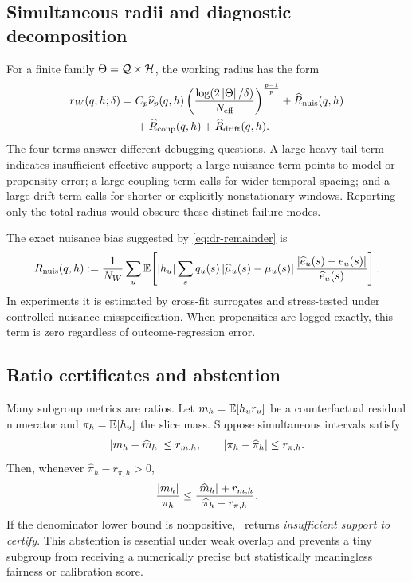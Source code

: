 \subsection{Simultaneous radii and diagnostic decomposition}
For a finite family $\Theta=\mathcal{Q}\times\mathcal{H}$, the working radius has the form
\begin{equation}
\begin{split}
 r_W(q,h;\delta)
 ={}& C_p\widehat\nu_p(q,h)
 \left(\frac{\log(2\left|\Theta\right|/\delta)}{N_{\mathrm{eff}}}\right)^{\frac{p-1}{p}}
 +\widehat R_{\mathrm{nuis}}(q,h)\\
 &+\widehat R_{\mathrm{coup}}(q,h)
 +\widehat R_{\mathrm{drift}}(q,h).
\end{split}
\label{eq:radius}
\end{equation}
The four terms answer different debugging questions. A large heavy-tail term indicates insufficient effective support; a large nuisance term points to model or propensity error; a large coupling term calls for wider temporal spacing; and a large drift term calls for shorter or explicitly nonstationary windows. Reporting only the total radius would obscure these distinct failure modes.

The exact nuisance bias suggested by \cref{eq:dr-remainder} is
\begin{equation}
R_{\mathrm{nuis}}(q,h)
:=\frac{1}{N_W}\sum_u
\mathbb{E}\!\left[
\left|h_u\right|\sum_s q_u(s)
\left|\widehat\mu_u(s)-\mu_u(s)\right|
\frac{\left|\widehat e_u(s)-e_u(s)\right|}{\widehat e_u(s)}
\right].
\label{eq:nuisance-rem}
\end{equation}
In experiments it is estimated by cross-fit surrogates and stress-tested under controlled nuisance misspecification. When propensities are logged exactly, this term is zero regardless of outcome-regression error.

\subsection{Ratio certificates and abstention}
Many subgroup metrics are ratios. Let $m_h=\mathbb{E}[h_u r_u]$ be a counterfactual residual numerator and $\pi_h=\mathbb{E}[h_u]$ the slice mass. Suppose simultaneous intervals satisfy
\begin{equation}
    \left|m_h-\widehat m_h\right|\le r_{m,h},
    \qquad
    \left|\pi_h-\widehat\pi_h\right|\le r_{\pi,h}.
\end{equation}
Then, whenever $\widehat\pi_h-r_{\pi,h}>0$,
\begin{equation}
    \frac{\left|m_h\right|}{\pi_h}
    \le
    \frac{\left|\widehat m_h\right|+r_{m,h}}
         {\widehat\pi_h-r_{\pi,h}}.
    \label{eq:ratio-cert}
\end{equation}
If the denominator lower bound is nonpositive, \COMET\ returns \emph{insufficient support to certify}. This abstention is essential under weak overlap and prevents a tiny subgroup from receiving a numerically precise but statistically meaningless fairness or calibration score.

